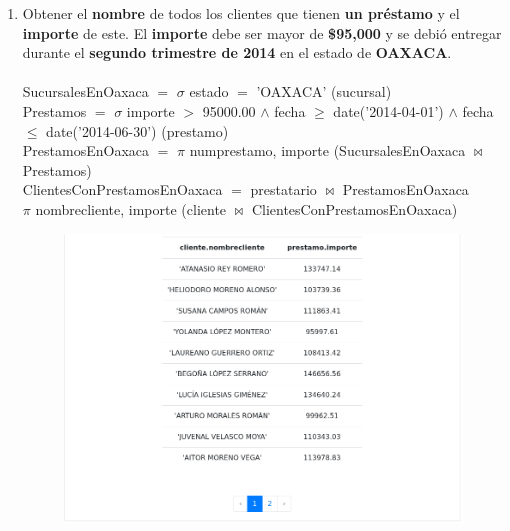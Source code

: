 \documentclass{exam}
\begin{document}
\begin{questions}
\begin{enumerate}[label=\alph*.]
		
		\newpage
		\item Obtener el \textbf{nombre} de todos los clientes que tienen \textbf{un préstamo} y el \textbf{importe} de este. El \textbf{importe} debe ser mayor de \textbf{\$95,000} y se debió entregar durante el \textbf{segundo trimestre de 2014} en el estado de \textbf{OAXACA}.\\\\
		SucursalesEnOaxaca $=$ $\sigma$ estado $=$ 'OAXACA' (sucursal)\\
		Prestamos $=$ $\sigma$ importe $>$ 95000.00 $\wedge$ fecha $\geqslant$ date('2014-04-01') $\wedge$ fecha $\leqslant$ date('2014-06-30') (prestamo)\\
		PrestamosEnOaxaca $=$ $\pi$ numprestamo, importe (SucursalesEnOaxaca $\bowtie$ Prestamos)\\
		ClientesConPrestamosEnOaxaca $=$ prestatario $\bowtie$ PrestamosEnOaxaca\\
		$\pi$ nombrecliente, importe (cliente $\bowtie$ ClientesConPrestamosEnOaxaca)\\
		\begin{center}
		\begin{figure}[h!]
			\includegraphics[width=17cm]{imgs/2c.png}
			\centering
		\end{figure}	
		\end{center}
		

\end{enumerate}
\end{questions}
\end{document}
